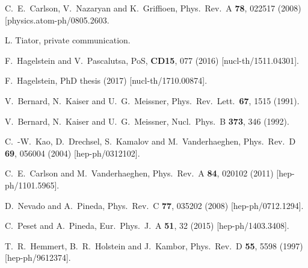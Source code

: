 \documentclass[twocolumn,prc,showpacs,nofootinbib,preprintnumbers,amsmath,amssymb,superscriptaddress]{revtex4-1}
\begin{document}
\begin{thebibliography}{99}
  
  C.~E.~Carlson, V.~Nazaryan and K.~Griffioen,
  Phys.\ Rev.\ A {\bf 78}, 022517 (2008)
  [physics.atom-ph/0805.2603.

L. Tiator, private communication.

F.~Hagelstein and V.~Pascalutsa, PoS, {\bf CD15}, 077 (2016) [nucl-th/1511.04301].


F.~Hagelstein, PhD thesis (2017) [nucl-th/1710.00874].


  V.~Bernard, N.~Kaiser and U.~G.~Meissner,
  Phys.\ Rev.\ Lett.\  {\bf 67}, 1515 (1991).

  V.~Bernard, N.~Kaiser and U.~G.~Meissner,
  Nucl.\ Phys.\ B {\bf 373}, 346 (1992).
  
  C.~-W.~Kao, D.~Drechsel, S.~Kamalov and M.~Vanderhaeghen,
  Phys.\ Rev.\ D {\bf 69}, 056004 (2004)
  [hep-ph/0312102].

  C.~E.~Carlson and M.~Vanderhaeghen,
  Phys.\ Rev.\ A {\bf 84}, 020102 (2011)
  [hep-ph/1101.5965].
  
  D.~Nevado and A.~Pineda,
  Phys.\ Rev.\ C {\bf 77}, 035202 (2008)
  [hep-ph/0712.1294].
  
  C.~Peset and A.~Pineda,
Eur.\ Phys.\ J.\ A {\bf 51}, 32 (2015)  [hep-ph/1403.3408].

  
  T.~R.~Hemmert, B.~R.~Holstein and J.~Kambor,
  Phys.\ Rev.\ D {\bf 55}, 5598 (1997)
  [hep-ph/9612374].


\end{thebibliography}
\end{document}
